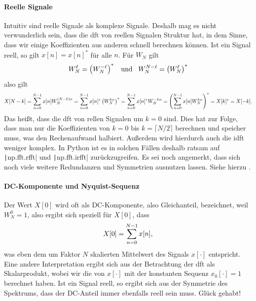 \paragraph{Reelle Signale}
%
Intuitiv sind reelle Signale  als komplexe Signale. 
Deshalb mag es nicht verwunderlich sein, dass die \gls{dft} von reellen Signalen Struktur hat, in dem Sinne, dass wir einige Koeffizienten aus anderen schnell berechnen können.
Ist ein Signal reell, so gilt $x[n] = x[n]^\ast$ für alle $n$.
Für $W_N$ gilt 
\[
W_N^\ell = \left(W_N^{-\ell}\right)^\ast
{\hspace{3mm} \text{und} \hspace{3mm}}
W_N^{N-\ell} = \left(W_N^{\ell}\right)^\ast
\]
also gilt
\[
X[N-k] 
    = {\sum\limits_{n=0}^{N-1}{x[n] W_N^{(N - k) n}}}
    = {\sum\limits_{n=0}^{N-1}{x[n]^\ast \left(W_N^{k n}\right)^\ast}}
    = {\sum\limits_{n=0}^{N-1}{x[n]^\ast W_N^{-k n}}}
    = \left({\sum\limits_{n=0}^{N-1}{x[n] W_N^{k n}}}\right)^\ast
    = X[k]^\ast
    = X[-k].
\]
Das heißt, dass die \gls{dft} von rellen Signalen  um $k=0$ sind.
Dies hat zur Folge, dass man nur die Koeffizienten von $k=0$ bis $k = \lceil N/2 \rceil$ berechnen und speicher muss, was den Rechenaufwand halbiert.
Außerdem wird hierdurch auch die \gls{idft} weniger komplex.
In Python ist es in solchen Fällen deshalb ratsam auf \texttt|np.fft.rfft| und \texttt|np.fft.irfft| zurückzugreifen.
Es sei noch angemerkt, dass sich noch viele weitere Redundanzen und Symmetrien ausnutzen lassen.
Siehe hierzu \cite[Kap. 7.2.1]{proakis2013}.
%
%
\paragraph{DC-Komponente und Nyquist-Sequenz}
%
Der Wert $X[0]$ wird oft als DC-Komponente, also Gleichanteil, bezeichnet, weil $W_N^0 = 1$, also ergibt sich speziell für $X[0]$, dass
\[
X[0] = {\sum\limits_{n = 0}^{N-1}{x[n]}},
\]
was eben dem um Faktor $N$ skalierten Mittelwert des Signals $x[\cdot]$ entspricht.
Eine andere Interpretation ergibt sich aus der Betrachtung der \gls{dft} als Skalarprodukt, wobei wir die  von $x[\cdot]$ mit der konstanten Sequenz $x_0[\cdot] = 1$ berechnet haben.
Ist ein Signal reell, so ergibt sich aus der Symmetrie des Spektrums, dass der DC-Anteil immer ebenfalls reell sein muss.
Glück gehabt!

